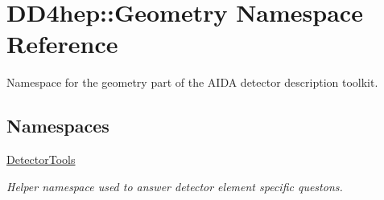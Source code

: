 \hypertarget{namespace_d_d4hep_1_1_geometry}{}\section{D\+D4hep\+:\+:Geometry Namespace Reference}
\label{namespace_d_d4hep_1_1_geometry}


Namespace for the geometry part of the A\+I\+DA detector description toolkit.  


\subsection*{Namespaces}
\begin{DoxyCompactItemize}
\item 
 \hyperlink{namespace_d_d4hep_1_1_geometry_1_1_detector_tools}{Detector\+Tools}
\begin{DoxyCompactList}\small\item\em Helper namespace used to answer detector element specific questons. \end{DoxyCompactList}\end{DoxyCompactItemize}
